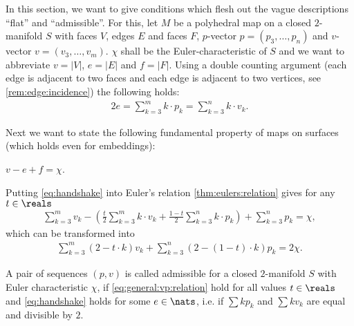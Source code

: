 In this section, we want to give conditions which flesh out the vague descriptions ``flat'' and ``admissible''. 
For this, let $M$ be a polyhedral map on a closed $2$-manifold $S$ with faces $V$, edges $E$ and faces $F$, $p$-vector $p = (p_3, \dots, p_n)$ and $v$-vector $v = (v_3, \dots, v_m)$. $\chi$ shall be the {\sc Euler}-characteristic of $S$ and we want to abbreviate $v = |V|$, $e = |E|$ and $f = |F|$. Using a double counting argument (each edge is adjacent to two faces and each edge is adjacent to two vertices, see \autoref{rem:edge:incidence}) the following holds:
\begin{align}
  2e = \sum_{k=3}^{m} k \cdot p_k = \sum_{k=3}^{n} k \cdot v_k \label{eq:handshake}.
\end{align}

Next we want to state the following fundamental property of maps on surfaces (which holds even for embeddings):
\begin{theorem}\label{thm:eulers:relation} $v - e + f = \chi$.
\end{theorem}

Putting \eqref{eq:handshake} into Euler's relation \autoref{thm:eulers:relation} gives for any $t \in \reals$ 
\begin{align*}
  \sum_{k=3}^m v_k - \left(\frac{t}{2} \sum_{k=3}^m k \cdot v_k + \frac{1-t}{2} \sum_{k=3}^n k \cdot p_k \right) + \sum_{k=3}^n p_k = \chi,
\end{align*}
which can be transformed into
\begin{align}
  \sum_{k=3}^m (2 - t \cdot k ) v_k + \sum_{k=3}^n ( 2 - (1 - t) \cdot k ) p_k = 2 \chi. \label{eq:general:vp:relation}
\end{align}

\begin{definition} A pair of sequences $(p, v)$ is called admissible for a closed $2$-manifold $S$ with {\sc Euler} characteristic $\chi$, if \eqref{eq:general:vp:relation} hold for all values $t \in \reals$ and \eqref{eq:handshake} holds for some $e \in \nats$, i.e. if $\sum k p_k$ and $\sum k v_k$ are equal and divisible by $2$.
\end{definition}

